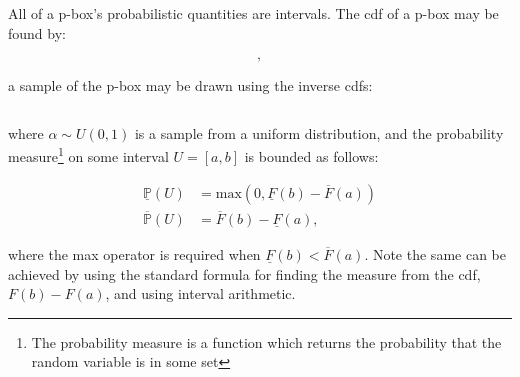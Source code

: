 \documentclass{juliacon}
\begin{document}
All of a p-box's probabilistic quantities are intervals. The cdf of a p-box may be found by: 

\begin{equation*}
  [\underline{F}(x), \overline{F}(x)] ,
\end{equation*}

\noindent a sample of the p-box may be drawn using the inverse cdfs: 

\begin{equation*}
  [\underline{F}^{-1}(\alpha), \overline{F}^{-1}(\alpha)]
\end{equation*}

\noindent where $\alpha \sim U(0,1)$ is a sample from a uniform distribution, and the probability measure\footnote{The probability measure is a function which returns the probability that the random variable is in some set} on some interval $U = [a, b]$ is bounded as follows:

\begin{align*}
  \underline{\mathbb{P}}(U) &= \text{max}(0, \underline{F}(b) - \overline{F}(a)) \\ 
  \overline{\mathbb{P}}(U)  &= \overline{F}(b) - \underline{F}(a) ,
\end{align*}

where the max operator is required when $\underline{F}(b) < \overline{F}(a)$. Note the same can be achieved by using the standard formula for finding the measure from the cdf, $F(b)- F(a)$, and using interval arithmetic.
\end{document}
